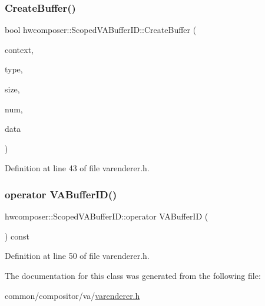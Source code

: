 \subsubsection{\texorpdfstring{Create\+Buffer()}{CreateBuffer()}}
{\footnotesize\ttfamily bool hwcomposer\+::\+Scoped\+V\+A\+Buffer\+I\+D\+::\+Create\+Buffer (\begin{DoxyParamCaption}\item[{V\+A\+Context\+ID}]{context,  }\item[{V\+A\+Buffer\+Type}]{type,  }\item[{uint32\+\_\+t}]{size,  }\item[{uint32\+\_\+t}]{num,  }\item[{void $\ast$}]{data }\end{DoxyParamCaption})\hspace{0.3cm}{\ttfamily [inline]}}



Definition at line 43 of file varenderer.\+h.


\begin{DoxyCode}{0}
\end{DoxyCode}
\mbox{\label{classhwcomposer_1_1ScopedVABufferID_a2ecadd61dd682c9ff200d701e4e4c59f}} 
\subsubsection{\texorpdfstring{operator V\+A\+Buffer\+I\+D()}{operator VABufferID()}}
{\footnotesize\ttfamily hwcomposer\+::\+Scoped\+V\+A\+Buffer\+I\+D\+::operator V\+A\+Buffer\+ID (\begin{DoxyParamCaption}{ }\end{DoxyParamCaption}) const\hspace{0.3cm}{\ttfamily [inline]}}



Definition at line 50 of file varenderer.\+h.


\begin{DoxyCode}{0}
\end{DoxyCode}


The documentation for this class was generated from the following file\+:\begin{DoxyCompactItemize}
\item 
common/compositor/va/\mbox{\hyperlink{varenderer_8h}{varenderer.\+h}}\end{DoxyCompactItemize}
